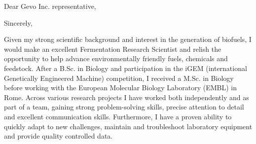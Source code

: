 \documentclass[11pt,a4paper,sans]{moderncv}
\begin{document}
\date{\today}
\opening{Dear Gevo Inc. representative,\vspace{-2mm}}
\closing{Sincerely,\vspace*{-4mm} }
\makelettertitle
\begin{spacing}{1.15}

Given my strong scientific background and interest in the generation of biofuels, I would make an excellent Fermentation Research Scientist and relish the opportunity to help advance environmentally friendly fuels, chemicals and feedstock. After a B.Sc. in Biology and participation in the iGEM (international Genetically Engineered Machine) competition, I received a M.Sc. in Biology before working with the European Molecular Biology Laboratory (EMBL) in Rome. Across various research projects I have worked both independently and as part of a team, gaining strong problem-solving skills, precise attention to detail and excellent communication skills. Furthermore, I have a proven ability to quickly adapt to new challenges, maintain and troubleshoot laboratory equipment and provide quality controlled data.
\par%


\end{spacing}
\end{document}
